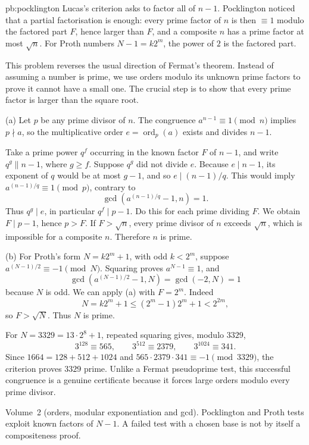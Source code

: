 \begin{solution}{pb:pocklington}
\idea Lucas's criterion asks to factor all of $n-1$. Pocklington noticed that a partial factorisation is enough: every prime
factor of $n$ is then $\equiv1$ modulo the factored part $F$, hence larger than $F$, and a composite $n$ has a prime factor at
most $\sqrt n$. For Proth numbers $N-1=k2^m$, the power of $2$ is the factored part.

\writeup
This problem reverses the usual direction of Fermat's theorem. Instead of assuming a number is prime, we use orders modulo its unknown prime factors to prove it cannot have a small one. The crucial step is to show that every prime factor is larger than the square root.

 (a) Let $p$ be any prime divisor of $n$. The congruence $a^{n-1}\equiv1\pmod n$ implies $p\nmid a$, so the multiplicative order $e=\operatorname{ord}_p(a)$ exists and divides $n-1$.

Take a prime power $q^f$ occurring in the known factor $F$ of $n-1$, and write $q^g\parallel n-1$, where $g\ge f$. Suppose $q^g$ did not divide $e$. Because $e\mid n-1$, its exponent of $q$ would be at most $g-1$, and so $e\mid(n-1)/q$. This would imply
$a^{(n-1)/q}\equiv1\pmod p$, contrary to
\[
\gcd\left(a^{(n-1)/q}-1,n\right)=1.
\]
Thus $q^g\mid e$, in particular $q^f\mid p-1$. Do this for each prime dividing $F$. We obtain $F\mid p-1$, hence $p>F$. If $F>\sqrt n$, every prime divisor of $n$ exceeds $\sqrt n$, which is impossible for a composite $n$. Therefore $n$ is prime.

(b) For Proth's form $N=k2^m+1$, with odd $k<2^m$, suppose
$a^{(N-1)/2}\equiv-1\pmod N$. Squaring proves $a^{N-1}\equiv1$, and
\[
\gcd\left(a^{(N-1)/2}-1,N\right)=\gcd(-2,N)=1
\]
because $N$ is odd. We can apply (a) with $F=2^m$. Indeed
\[
N=k2^m+1\le(2^m-1)2^m+1<2^{2m},
\]
so $F>\sqrt N$. Thus $N$ is prime.

For $N=3329=13\cdot2^8+1$, repeated squaring gives, modulo $3329$,
\[
3^{128}\equiv565,\qquad 3^{512}\equiv2379,\qquad
3^{1024}\equiv341.
\]
Since $1664=128+512+1024$ and
$565\cdot2379\cdot341\equiv-1\pmod{3329}$, the criterion proves $3329$ prime. Unlike a Fermat pseudoprime test, this successful congruence is a genuine certificate because it forces large orders modulo every prime divisor.

\tools Volume~2 (orders, modular exponentiation and gcd).
\leads Pocklington and Proth tests exploit known factors of $N-1$. A failed test with a chosen base is not by itself a compositeness proof.
\end{solution}

